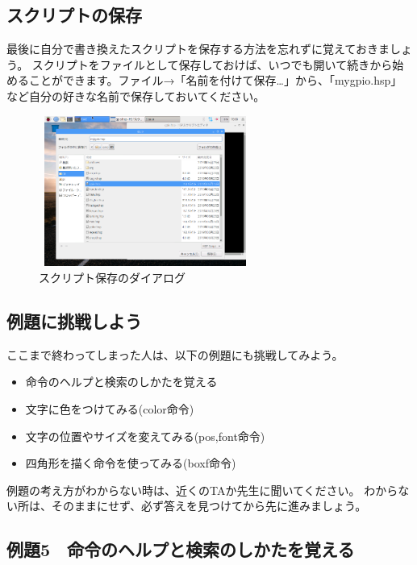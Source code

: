 \clearpage
\subsection{スクリプトの保存}

最後に自分で書き換えたスクリプトを保存する方法を忘れずに覚えておきましょう。
スクリプトをファイルとして保存しておけば、いつでも開いて続きから始めることができます。ファイル→「名前を付けて保存…」から、「mygpio.hsp」など自分の好きな名前で保存しておいてください。

\begin{figure}[H]
    \begin{center}
        \includegraphics[keepaspectratio,width=6.976cm,height=4.944cm]{text02-img/text02-img028.png}
        \caption{スクリプト保存のダイアログ}
    \end{center}
\end{figure}

\subsection{例題に挑戦しよう}

ここまで終わってしまった人は、以下の例題にも挑戦してみよう。

\begin{itemize}
    \item 命令のヘルプと検索のしかたを覚える
    \item 文字に色をつけてみる(color命令)
    \item 文字の位置やサイズを変えてみる(pos,font命令)
    \item 四角形を描く命令を使ってみる(boxf命令)
\end{itemize}

例題の考え方がわからない時は、近くのTAか先生に聞いてください。
わからない所は、そのままにせず、必ず答えを見つけてから先に進みましょう。

\clearpage
\subsection{例題5　命令のヘルプと検索のしかたを覚える}

